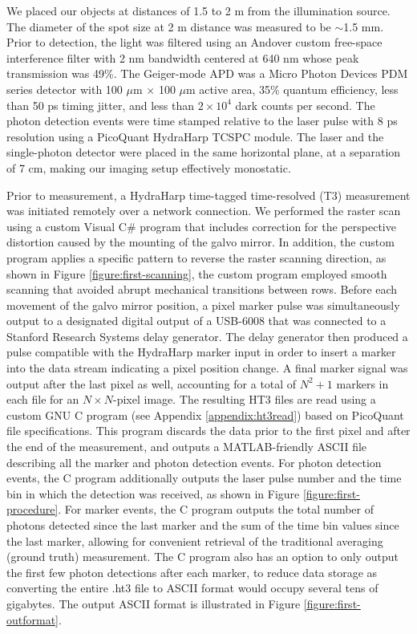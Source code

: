 We placed our objects at distances of 1.5 to 2 m from the illumination source. The diameter of the spot size at 2 m distance was measured to be $\sim$1.5 mm. Prior to detection, the light was filtered using an Andover custom free-space interference filter with 2 nm bandwidth centered at 640 nm whose peak transmission was 49\%. The Geiger-mode APD was a Micro Photon Devices PDM series detector with 100 $\mu$m $\times$ 100 $\mu$m active area, 35\% quantum efficiency, less than 50 ps timing jitter, and less than $2\times 10^4$ dark counts per second. The photon detection events were time stamped relative to the laser pulse with 8 ps resolution using a PicoQuant HydraHarp TCSPC module. The laser and the single-photon detector were placed in the same horizontal plane, at a separation of 7 cm, making our imaging setup effectively monostatic.

Prior to measurement, a HydraHarp time-tagged time-resolved (T3) measurement was initiated remotely over a network connection. We performed the raster scan using a custom Visual C\# program that includes correction for the perspective distortion caused by the mounting of the galvo mirror. In addition, the custom program applies a specific pattern to reverse the raster scanning direction, as shown in Figure \ref{figure:first-scanning}, the custom program employed smooth scanning that avoided abrupt mechanical transitions between rows. Before each movement of the galvo mirror position, a pixel marker pulse was simultaneously output to a designated digital output of a USB-6008 that was connected to a Stanford Research Systems delay generator. The delay generator then produced a pulse compatible with the HydraHarp marker input in order to insert a marker into the data stream indicating a pixel position change. A final marker signal was output after the last pixel as well, accounting for a total of $N^2+1$ markers in each file for an $N \times N$-pixel image. The resulting HT3 files are read using a custom GNU C program (see Appendix \ref{appendix:ht3read}) based on PicoQuant file specifications. This program discards the data prior to the first pixel and after the end of the measurement, and outputs a MATLAB-friendly ASCII file describing all the marker and photon detection events. For photon detection events, the C program additionally outputs the laser pulse number and the time bin in which the detection was received, as shown in Figure \ref{figure:first-procedure}. For marker events, the C program outputs the total number of photons detected since the last marker and the sum of the time bin values since the last marker, allowing for convenient retrieval of the traditional averaging (ground truth) measurement. The C program also has an option to only output the first few photon detections after each marker, to reduce data storage as converting the entire .ht3 file to ASCII format would occupy several tens of gigabytes. The output ASCII format is illustrated in Figure \ref{figure:first-outformat}.

